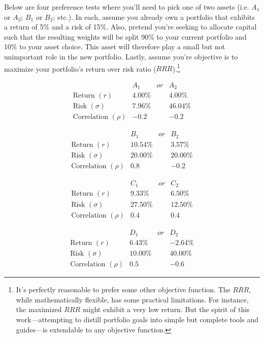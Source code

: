 \documentclass[]{article}
\let\rmarkdownfootnote\footnote%
\def\footnote{\protect\rmarkdownfootnote}
\begin{document}
Below are four preference tests where you'll need to pick one of two
assets (i.e. \(A_1\) or \(A_2\); \(B_1\) or \(B_2\); etc.). In each,
assume you already own a portfolio that exhibits a return of 5\% and a
risk of 15\%. Also, pretend you're seeking to allocate capital such that
the resulting weights will be split 90\% to your current portfolio and
10\% to your asset choice. This asset will therefore play a small but
not unimportant role in the new portfolio. Lastly, assume you're
objective is to maximize your portfolio's return over risk ratio
(\(RRR\)).\footnote{It's perfectly reasonable to prefer some other
  objective function. The \(RRR\), while mathematically flexible, has
  some practical limitations. For instance, the maximized \(RRR\) might
  exhibit a very low return. But the spirit of this work---attempting to
  distill portfolio goals into simple but complete tools and guides---is
  extendable to any objective function.}

\[
\begin{array}{r|c|c|c}
\text{}                   & A_1    & or & A_2 \\
\hline{}
\text{Return }(r)         & 4.00\% &    & 4.00\% \\
\text{Risk }(\sigma)      & 7.96\% &    & 46.04\% \\
\text{Correlation }(\rho) & -0.2   &    & -0.2
\end{array}
\]

\[
\begin{array}{r|c|c|c}
\text{}                   & B_1     & or & B_2  \\
\hline
\text{Return }(r)         & 10.54\% &    & 3.57\% \\
\text{Risk }(\sigma)      & 20.00\% &    & 20.00\% \\
\text{Correlation }(\rho) & 0.8     &    & -0.2
\end{array}
\]

\[
\begin{array}{r|c|c|c}
\text{}                   & C_1     & or & C_2 \\
\hline{}
\text{Return }(r)         & 9.33\%  &    & 6.50\% \\
\text{Risk }(\sigma)      & 27.50\% &    & 12.50\% \\
\text{Correlation }(\rho) & 0.4     &    & 0.4
\end{array}
\]

\[
\begin{array}{r|c|c|c}
\text{}                   & D_1     & or & D_2 \\
\hline{}
\text{Return }(r)         & 6.43\%  &    & -2.64\% \\
\text{Risk }(\sigma)      & 10.00\% &    & 40.00\% \\
\text{Correlation }(\rho) & 0.5     &    & -0.6
\end{array}
\]
\end{document}
